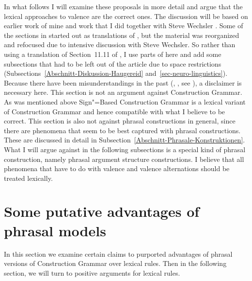 In what follows I will examine these proposals in more detail and argue that the lexical approaches
to valence are the correct ones. The discussion will be based on earlier work of mine
\citep{Mueller2006d,Mueller2007d,MuellerPersian} and work that I did together with Steve Wechsler
\citep{MWArgSt,MWArgStReply}. Some of the sections in \citet{MWArgSt} started out as translations of
\citet{MuellerGTBuch2}, but the material was reorganized and refocused due to intensive discussion
with Steve Wechsler. So rather than using a translation of Section~11.11 of ,
I use parts of  here and add some subsections that had to be left out of the article
due to space restrictions (Subsections~\ref{Abschnitt-Diskussion-Haugereid} and~\ref{sec-neuro-linguistics}).
Because there have been misunderstandings in the past (\eg, , see ), a disclaimer is necessary
here. This section is not an argument against Construction Grammar. As was mentioned above
Sign"=Based Construction Grammar is a lexical variant of Construction Grammar and hence compatible
with what I believe to be correct. This section is also not against phrasal constructions in
general, since there are phenomena that seem to be best captured with phrasal constructions. These are
discussed in detail in Subsection~\ref{Abschnitt-Phrasale-Konstruktionen}. What I will argue against in
the following subsections is a special kind of phrasal construction, namely phrasal argument
structure constructions. I believe that all phenomena that have to do with valence and valence
alternations should be treated lexically.





\section{Some putative advantages of phrasal models}
\label{Abschnitt-Stoepselei}
%

In this section we examine certain claims to purported advantages of phrasal versions of Construction Grammar over lexical rules.  
Then in the following section, we will turn to positive arguments for lexical rules. 


